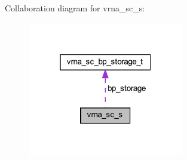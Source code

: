 Collaboration diagram for vrna\+\_\+sc\+\_\+s\+:
\nopagebreak
\begin{figure}[H]
\begin{center}
\leavevmode
\includegraphics[width=193pt]{structvrna__sc__s__coll__graph}
\end{center}
\end{figure}
